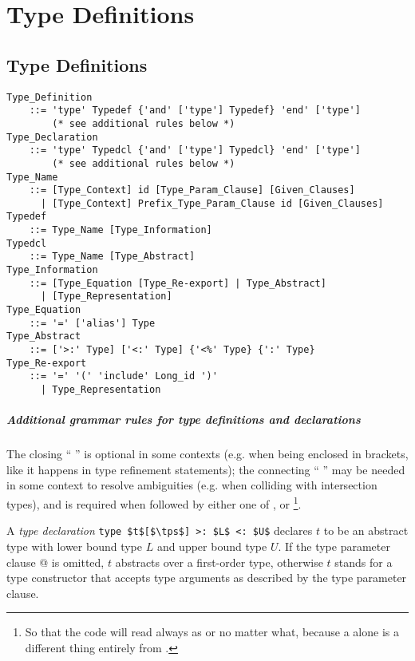 
\chapter{Type Definitions}

\minitoc

\newpage

\section{Type Definitions}
\label{sec:type-decls-aliases}

\grammar\begin{lstlisting}
Type_Definition 
    ::= 'type' Typedef {'and' ['type'] Typedef} 'end' ['type']
        (* see additional rules below *)
Type_Declaration
    ::= 'type' Typedcl {'and' ['type'] Typedcl} 'end' ['type']
        (* see additional rules below *)
Type_Name
    ::= [Type_Context] id [Type_Param_Clause] [Given_Clauses]
      | [Type_Context] Prefix_Type_Param_Clause id [Given_Clauses]
Typedef 
    ::= Type_Name [Type_Information]
Typedcl
    ::= Type_Name [Type_Abstract]
Type_Information
    ::= [Type_Equation [Type_Re-export] | Type_Abstract]
      | [Type_Representation]
Type_Equation 
    ::= '=' ['alias'] Type
Type_Abstract 
    ::= ['>:' Type] ['<:' Type] {'<%' Type} {':' Type}
Type_Re-export
    ::= '=' '(' 'include' Long_id ')'
      | Type_Representation
\end{lstlisting}

\paragraph{Additional grammar rules for type definitions and declarations}
The closing ``\,\,'' is optional in some contexts (e.g. when being enclosed in brackets, like it happens in type refinement statements); the connecting ``\,\code{['type']}\,'' may be needed in some context to resolve ambiguities (e.g. when colliding with intersection types), and is required when followed by either one of ,  or \footnote{So that the code will read always as  or  no matter what, because a  alone is a different thing entirely from .}. 

A {\em type declaration} \lstinline!type $t$[$\tps$] >: $L$ <: $U$! declares $t$ to be an abstract type with lower bound type $L$ and upper bound type $U$. If the type parameter clause \lstinline@[$\tps$]@ is omitted, $t$ abstracts over a first-order type, otherwise $t$ stands for a type constructor that accepts type arguments as described by the type parameter clause. 

